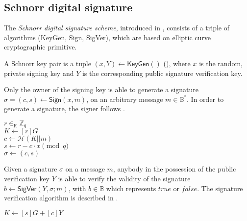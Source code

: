 \clearpage
\subsection{Schnorr digital signature}
The \textit{Schnorr digital signature scheme}, introduced in \cite{Schnorr90}, consists of a triple of algorithms (\textsf{KeyGen}, \textsf{Sign}, \textsf{SigVer}), which are based on elliptic curve cryptographic primitive.

A Schnorr key pair is a tuple $(x, Y) \gets \mathsf{KeyGen}()$ (), where $x$ is the random, private signing key and $Y$ is the corresponding public signature verification key.

Only the owner of the signing key is able to generate a signature $\sigma = (c, s) \gets \mathsf{Sign} (x, m)$, on an arbitrary message $m \in \mathbb{B}^*$. In order to generate a signature, the signer follows .

\begin{algorithm}[ht]
    \DontPrintSemicolon
    \caption{$\mathsf{Sign} (x, m)$}
    
    $r \in_\mathrm{R} \mathbb{Z}_q$ \\
    $K \gets [r]G$ \\
    $c \gets \mathcal{H}(K || m)$ \\
    $s \gets r - c \cdot x \pmod q$ \\
    $\sigma \gets (c, s)$ \\
    \Return{$\sigma$} 
    
    \label{alg: sign}
\end{algorithm}

Given a signature $\sigma$ on a message $m$, anybody in the possession of the public verification key $Y$ is able to verify the validity of the signature $b \gets \mathsf{SigVer} (Y, \sigma; m)$, with $b \in \mathbb{B}$ which represents $true$ or $false$. The signature verification algorithm is described in .

\begin{algorithm}[H]
    \DontPrintSemicolon
    \caption{$\mathsf{SigVer} (Y, \sigma; m)$}
    
    $K \gets [s]G + [c]Y$ \\
     
    
    \label{alg: sig ver}
\end{algorithm}
